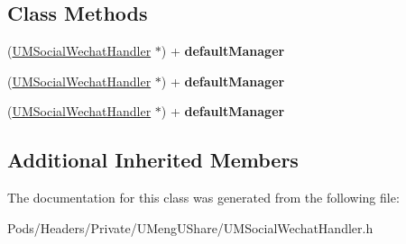 \subsection*{Class Methods}
\begin{DoxyCompactItemize}
\item 
\mbox{\label{interface_u_m_social_wechat_handler_aedd2d22e09ebe3412e56e637d01cea89}} 
(\mbox{\hyperlink{interface_u_m_social_wechat_handler}{U\+M\+Social\+Wechat\+Handler}} $\ast$) + {\bfseries default\+Manager}
\item 
\mbox{\label{interface_u_m_social_wechat_handler_aedd2d22e09ebe3412e56e637d01cea89}} 
(\mbox{\hyperlink{interface_u_m_social_wechat_handler}{U\+M\+Social\+Wechat\+Handler}} $\ast$) + {\bfseries default\+Manager}
\item 
\mbox{\label{interface_u_m_social_wechat_handler_aedd2d22e09ebe3412e56e637d01cea89}} 
(\mbox{\hyperlink{interface_u_m_social_wechat_handler}{U\+M\+Social\+Wechat\+Handler}} $\ast$) + {\bfseries default\+Manager}
\end{DoxyCompactItemize}
\subsection*{Additional Inherited Members}


The documentation for this class was generated from the following file\+:\begin{DoxyCompactItemize}
\item 
Pods/\+Headers/\+Private/\+U\+Meng\+U\+Share/U\+M\+Social\+Wechat\+Handler.\+h\end{DoxyCompactItemize}
